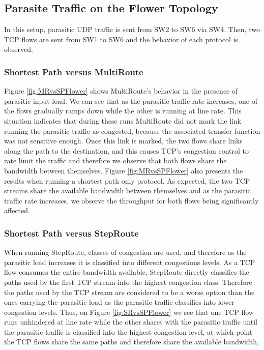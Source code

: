 \subsection{Parasite Traffic on the Flower Topology}

In this setup, parasitic UDP traffic is sent from SW2 to SW6 via SW4. Then, two TCP flows are sent from SW1 to SW6 and the behavior of each protocol is observed.

\subsubsection{Shortest Path versus MultiRoute}


Figure \ref{fig:MRvsSPFlower} shows MultiRoute's behavior in the presence of parasitic input load. We can see that as the parasitic traffic rate increases, one of the flows gradually ramps down while the other is running at line rate. This situation indicates that during these runs MultiRoute did not mark the link running the parasitic traffic as congested, because the associated transfer function was not sensitive enough. Once this link is marked, the two flows share links along the path to the destination, and this causes TCP's congestion control to rate limit the traffic and therefore we observe that both flows share the bandwidth between themselves. Figure \ref{fig:MRvsSPFlower} also presents the results when running a shortest path only protocol. As expected, the two TCP streams share the available bandwidth between themselves and as the parasitic traffic rate increases, we observe the throughput for both flows being significantly affected. 


\subsubsection{Shortest Path versus StepRoute}


When running StepRoute, classes of congestion are used, and therefore as the parasitic load increases it is classified into different congestions levels. As a TCP flow consumes the entire bandwidth available, StepRoute directly classifies the paths used by the first TCP stream into the highest congestion class. Therefore the paths used by the TCP stream are considered to be a worse option than the ones carrying the parasitic load as the parasitic traffic classifies into lower congestion levels. Thus, on Figure \ref{fig:SRvsSPFlower} we see that one TCP flow runs unhindered at line rate while the other shares with the parasitic traffic until the parasitic traffic is classified into the highest congestion level, at which point the TCP flows share the same paths and therefore share the available bandwidth,

